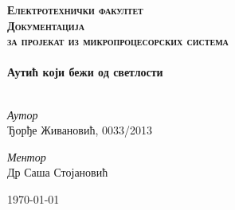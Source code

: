 

\begin{titlepage}

\begin{center}



\textsc{\Huge \textbf{Електротехнички факултет}}\\[5cm]

\textsc{\Huge \textbf{Документација }}\\[0.5cm]
\textsc{\large{\textbf{за пројекат из микропроцесорских система}}}
\\[4cm]

\HRule \\[0.8cm]
{ \Huge \bfseries Аутић који бежи од светлости}\\[0.4cm]

\HRule \\[5cm]

\begin{minipage}{0.55\textwidth}
\begin{flushleft} \large
\emph{Аутор}\\
Ђорђе Живановић, 0033/2013\\
\end{flushleft}
\end{minipage}
\begin{minipage}{0.4\textwidth}
\begin{flushright} \large
\emph{Ментор} \\
Др Саша Стојановић
\end{flushright}
\end{minipage}



\vfill

{\large \today}

\end{center}

\end{titlepage}